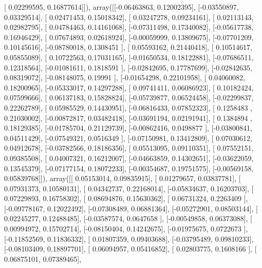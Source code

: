 \documentclass{article}
\begin{document}
       [ 0.02299595,  0.16877614]]), array([[-0.06463863,  0.12002395],
       [-0.03550897,  0.03329514],
       [ 0.02471453,  0.15018342],
       [ 0.03247278,  0.09234161],
       [ 0.02113143,  0.02982795],
       [ 0.04784463,  0.14161068],
       [-0.07311498,  0.17340082],
       [-0.05617738,  0.16946429],
       [ 0.07674893,  0.02618924],
       [-0.00059999,  0.13809675],
       [-0.07701209,  0.10145616],
       [-0.08780018,  0.1308451 ],
       [ 0.05593162,  0.21440418],
       [ 0.10514617,  0.05855089],
       [ 0.10722563,  0.17031165],
       [-0.01650534,  0.18122881],
       [-0.07686511,  0.12318564],
       [-0.01081611,  0.1818591 ],
       [-0.02842695,  0.17787699],
       [-0.02842635,  0.08319072],
       [-0.08148075,  0.19991   ],
       [-0.01654298,  0.22101958],
       [ 0.04060082,  0.18200965],
       [-0.05333017,  0.14297288],
       [ 0.09741411,  0.06086923],
       [ 0.10182424,  0.07599666],
       [ 0.06137183,  0.15828824],
       [-0.05739877,  0.06524458],
       [-0.02299837,  0.22262789],
       [ 0.05985529,  0.14430951],
       [-0.06816433,  0.07852323],
       [ 0.1258483 ,  0.21030002],
       [-0.00872817,  0.03482418],
       [-0.03691194,  0.02191941],
       [ 0.1384894 ,  0.18129385],
       [-0.01785704,  0.21129739],
       [-0.00862416,  0.0498877 ],
       [-0.03800841,  0.04511429],
       [-0.07549321,  0.0516349 ],
       [-0.07150981,  0.13412809],
       [ 0.07030612,  0.04912678],
       [-0.03782566,  0.18186356],
       [ 0.05513095,  0.09110351],
       [ 0.07552151,  0.09385508],
       [ 0.04007321,  0.16212007],
       [-0.04663859,  0.14302651],
       [-0.03622059,  0.13545379],
       [-0.07177154,  0.18072233],
       [-0.00354687,  0.19751575],
       [-0.00569158,  0.05839768]]), array([[ 0.05153014,  0.09835915],
       [ 0.01279657,  0.03837781],
       [ 0.07931373,  0.10580131],
       [ 0.04342737,  0.22168014],
       [-0.05834637,  0.16203703],
       [ 0.07229893,  0.16758302],
       [ 0.08694876,  0.15630362],
       [ 0.06731324,  0.2263409 ],
       [-0.09778167,  0.12022492],
       [-0.07308489,  0.06881364],
       [-0.05272901,  0.08503144],
       [ 0.02245277,  0.12488485],
       [-0.03587574,  0.0647658 ],
       [-0.00549858,  0.06373088],
       [ 0.00994972,  0.15702714],
       [-0.08150404,  0.14242675],
       [-0.01975675,  0.0722673 ],
       [-0.11852569,  0.11836332],
       [ 0.01807359,  0.09403688],
       [-0.03795489,  0.09810233],
       [-0.08103409,  0.18897701],
       [ 0.06094957,  0.05416852],
       [ 0.02803775,  0.1608166 ],
       [ 0.06875101,  0.07389465],
\end{document}
